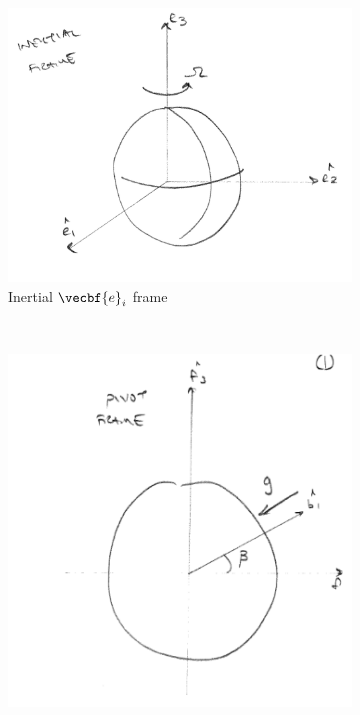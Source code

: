 \documentclass[11pt, reqno]{article}   	%
\begin{document}
\begin{figure}[htbp] 
    \centering 
    \begin{subfigure}[htbp]{0.3\textwidth} 
        \includegraphics[width=\textwidth]{figures/inertial_frame.pdf} 
        \caption{Inertial \(\vecbf{e}_i \) frame} \label{fig:inertial} 
    \end{subfigure}~ %
    \begin{subfigure}[htbp]{0.3\textwidth} 
        \includegraphics[width=\textwidth]{figures/earth_fixed_frame.pdf} 

\end{subfigure}
\end{figure}
\end{document}
